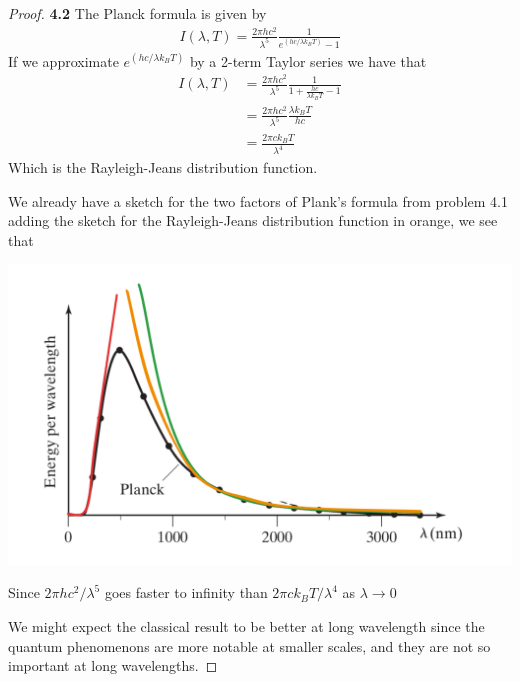 \documentclass[11pt]{article}
\theoremstyle{definition}
\begin{document}
\begin{proof}{\textbf{4.2}}
    The Planck formula is given by
    \begin{align*}
        I(\lambda, T)
        = \frac{2\pi hc^2}{\lambda^5}\frac{1}{e^{(hc/\lambda k_B T)} -1}
    \end{align*}
    If we approximate $e^{(hc/\lambda k_B T)}$ by a 2-term Taylor series we
    have that 
    \begin{align*}
        I(\lambda, T)
        &= \frac{2\pi hc^2}{\lambda^5}\frac{1}{1 + \frac{hc}{\lambda k_B T} -1}\\
        &= \frac{2\pi hc^2}{\lambda^5}\frac{\lambda k_B T}{hc}\\
        &= \frac{2\pi c k_B T}{\lambda^4}
    \end{align*}
    Which is the Rayleigh-Jeans distribution function.

    We already have a sketch for the two factors of Plank's formula from
    problem 4.1 adding the sketch for the Rayleigh-Jeans distribution function
    in orange, we see that
    \begin{center}
        \includegraphics[scale=0.42]{ch4-2.png}
    \end{center}
    Since $2\pi hc^2/\lambda^5$ goes faster to infinity than 
    $2\pi c k_B T / \lambda^4$ as $\lambda \to 0$    

    We might expect the classical result to be better at long wavelength
    since the quantum phenomenons are more notable at smaller scales, and
    they are not so important at long wavelengths.
\end{proof}
\cleardoublepage
\end{document}
